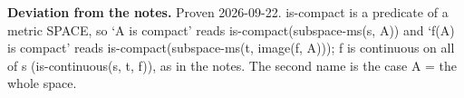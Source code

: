 %
\noindent\textbf{Deviation from the notes.} Proven 2026-09-22. is-compact is a predicate of a metric SPACE, so `A is compact' reads is-compact(subspace-ms(s, A)) and `f(A) is compact' reads is-compact(subspace-ms(t, image(f, A))); f is continuous on all of s (is-continuous(s, t, f)), as in the notes. The second name is the case A = the whole space.
%
\renewcommand{\thethm}{3.20}
\begin{cor}\label{thm:compact-continuous-bijection-is-homeomorphism}
%
\leavevmode
{}
%
\end{cor}
%
